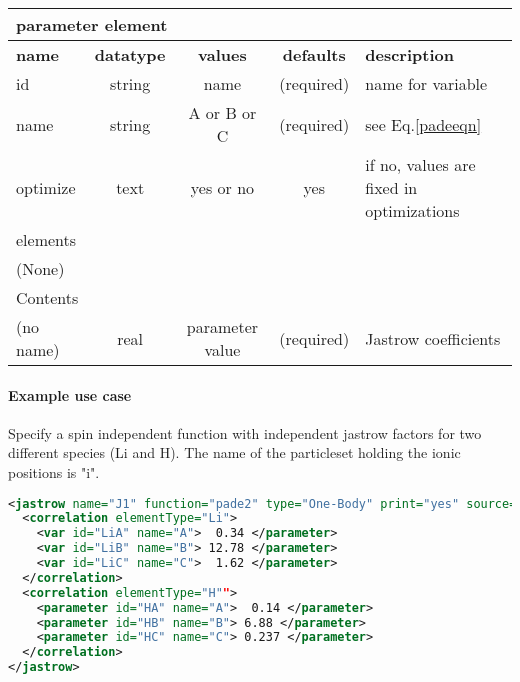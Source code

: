 \begin{table}[h]
\begin{center}
\begin{tabular}{l c c c l }
\hline
\multicolumn{5}{l}{parameter element} \\
\hline
\bfseries name & \bfseries datatype & \bfseries values & \bfseries defaults & \bfseries description \\
\hline
id & string & name & (required) & name for variable \\
name & string & A or B or C & (required) & see Eq.\ref{padeeqn}\\
optimize & text & yes or no & yes & if no, values are fixed in optimizations \\
\hline
\multicolumn{5}{l}{elements}\\ \hline
(None) & & & \\ \hline
\multicolumn{5}{l}{Contents}\\ \hline
 (no name) & real & parameter value & (required) & Jastrow coefficients \\ \hline
\end{tabular}
\end{center}
\end{table}

\paragraph{Example use case}
\label{sec:1bjpadeexamples}

Specify a spin independent function with independent jastrow factors for two different species (Li and H).
The name of the particleset holding the ionic positions is "i".
\begin{lstlisting}[language=xml]
<jastrow name="J1" function="pade2" type="One-Body" print="yes" source="i">
  <correlation elementType="Li">
    <var id="LiA" name="A">  0.34 </parameter>
    <var id="LiB" name="B"> 12.78 </parameter>
    <var id="LiC" name="C">  1.62 </parameter>
  </correlation>
  <correlation elementType="H"">
    <parameter id="HA" name="A">  0.14 </parameter>
    <parameter id="HB" name="B"> 6.88 </parameter>
    <parameter id="HC" name="C"> 0.237 </parameter>
  </correlation>
</jastrow>
\end{lstlisting}
